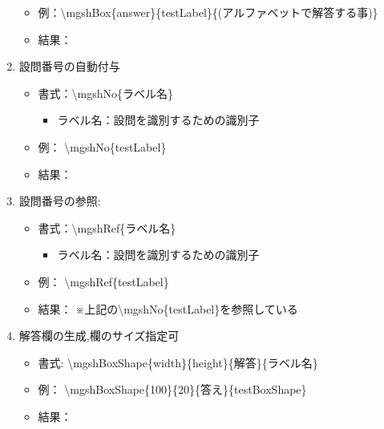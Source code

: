 \documentclass[10pt]{jarticle}
\begin{document}
\begin{enumerate}
\begin{itemize}
    \item 例：\textbackslash mgshBox\{answer\}\{testLabel\}\{(アルファベットで解答する事)\}
    \item 結果：
  \end{itemize}
  \item 設問番号の自動付与
    \begin{itemize}
      \item 書式：\textbackslash mgshNo\{ラベル名\}
        \begin{itemize}
          \item ラベル名：設問を識別するための識別子
        \end{itemize}
      \item 例： \textbackslash mgshNo\{testLabel\}
      \item 結果： 
    \end{itemize}
  \item 設問番号の参照:
    \begin{itemize}
      \item 書式：\textbackslash mgshRef\{ラベル名\}
        \begin{itemize}
          \item ラベル名：設問を識別するための識別子 
        \end{itemize}
      \item 例：  \textbackslash mgshRef\{testLabel\} 
      \item 結果： ※上記の\textbackslash mgshNo\{testLabel\}を参照している
    \end{itemize}
  \item 解答欄の生成,欄のサイズ指定可
    \begin{itemize}
      \item 書式: \textbackslash mgshBoxShape\{width\}\{height\}\{解答\}\{ラベル名\}
      \item 例：  \textbackslash mgshBoxShape\{100\}\{20\}\{答え\}\{testBoxShape\}
      \item 結果：
    \end{itemize}
\end{enumerate}
\end{document}
